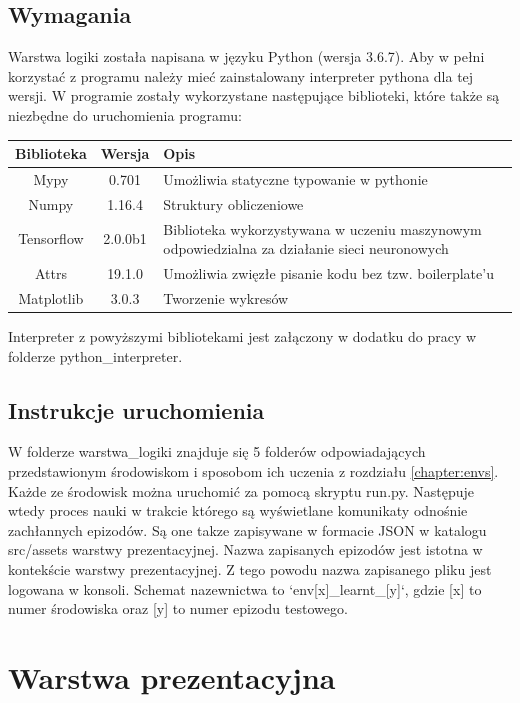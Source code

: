 \documentclass[12pt]{book}
\theoremstyle{plain}
\begin{document}
\subsection{Wymagania}
Warstwa logiki została napisana w języku Python (wersja 3.6.7). Aby w pełni korzystać z programu należy mieć zainstalowany interpreter pythona dla tej wersji. W programie zostały wykorzystane następujące biblioteki, które także są niezbędne do uruchomienia programu: \newline \newline
\renewcommand{\arraystretch}{1.3}
\begin{tabular}{| c | c | L{5cm} |}
	\hline
	Biblioteka   &  Wersja & Opis \\	\hline
	Mypy & 0.701 & Umożliwia statyczne typowanie w pythonie \\ \hline
	Numpy & 1.16.4 & Struktury obliczeniowe \\ \hline
	Tensorflow & 2.0.0b1 &  Biblioteka wykorzystywana w uczeniu maszynowym odpowiedzialna za działanie sieci neuronowych \\ \hline
	Attrs & 19.1.0 & Umożliwia zwięzłe pisanie kodu bez tzw. boilerplate'u \\ \hline
	Matplotlib & 3.0.3 & Tworzenie wykresów \\ \hline
\end{tabular}\newline \newline
Interpreter z powyższymi bibliotekami jest załączony w dodatku do pracy w folderze python\_interpreter.
\subsection{Instrukcje uruchomienia}
W folderze warstwa\_logiki znajduje się 5 folderów odpowiadających przedstawionym środowiskom i sposobom ich uczenia z rozdziału \ref{chapter:envs}. Każde ze środowisk można uruchomić za pomocą skryptu run.py. Następuje wtedy proces nauki w trakcie którego są wyświetlane komunikaty odnośnie zachłannych epizodów. Są one takze zapisywane w formacie JSON w katalogu src/assets warstwy prezentacyjnej. Nazwa zapisanych epizodów jest istotna w kontekście warstwy prezentacyjnej. Z tego powodu nazwa zapisanego pliku jest logowana w konsoli. Schemat nazewnictwa to `env[x]\_learnt\_[y]`, gdzie [x] to numer środowiska oraz [y] to numer epizodu testowego.

\section{Warstwa prezentacyjna}
\end{document}
